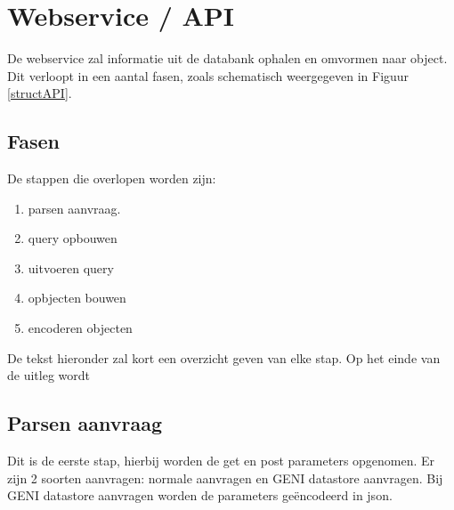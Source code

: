 \section{Webservice / API}
\npar
De webservice zal informatie uit de databank ophalen en omvormen naar object. Dit verloopt in een aantal fasen, zoals schematisch weergegeven in Figuur \ref{structAPI}.
\clearpage
\subsection{Fasen}
\npar
De stappen die overlopen worden zijn:
\begin{enumerate}
\item parsen aanvraag.
\item query opbouwen
\item uitvoeren query
\item opbjecten bouwen
\item encoderen objecten
\end{enumerate}
De tekst hieronder zal kort een overzicht geven van elke stap. Op het einde van de uitleg wordt 
\subsection{Parsen aanvraag}
\npar
Dit is de eerste stap, hierbij worden de get en post parameters opgenomen.
Er zijn 2 soorten aanvragen: normale aanvragen en GENI datastore aanvragen. Bij GENI datastore aanvragen worden de parameters ge\"encodeerd in json.